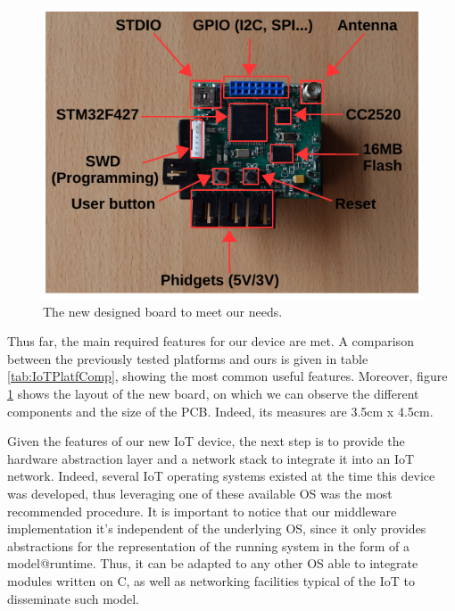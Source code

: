 \begin{figure}[htb]
	\centering
	\includegraphics[width=0.7\columnwidth]{chapters/modelsAtRuntimeContiki.images/newBoard.pdf}
	\caption{The new designed board to meet our needs.} \label{fig:newBoard}
\end{figure}

Thus far, the main required features for our device are met.
A comparison between the previously tested platforms and ours is given in table \ref{tab:IoTPlatfComp}, showing the most common useful features.
Moreover, figure \ref{fig:newBoard} shows the layout of the new board, on which we can observe the different components and the size of the PCB.
Indeed, its measures are 3.5cm x 4.5cm.

Given the features of our new IoT device, the next step is to provide the hardware abstraction layer and a network stack to integrate it into an IoT network.
Indeed, several IoT operating systems existed at the time this device was developed, thus leveraging one of these available OS was the most recommended procedure.
It is important to notice that our middleware implementation it's independent of the underlying OS, since it only provides abstractions for the representation of the running system in the form of a model@runtime.
Thus, it can be adapted to any other OS able to integrate modules written on C, as well as networking facilities typical of the IoT to disseminate such model.


